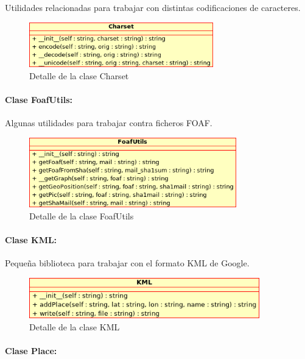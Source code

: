 Utilidades relacionadas para trabajar con distintas codificaciones de caracteres.

\begin{figure}[H]
	\centering
 	\includegraphics[width=8cm]{images/uml/clases/charset-class.png}
	\caption{Detalle de la clase Charset}
	\label{fig:uml:charset-class}
\end{figure}

\paragraph{Clase FoafUtils:}

Algunas utilidades para trabajar contra ficheros FOAF.

\begin{figure}[H]
	\centering
 	\includegraphics[width=9cm]{images/uml/clases/foafutils-class.png}
	\caption{Detalle de la clase FoafUtils}
	\label{fig:uml:foafutils-class}
\end{figure}

\paragraph{Clase KML:}

Pequeña biblioteca para trabajar con el formato KML de Google.

\begin{figure}[H]
	\centering
 	\includegraphics[width=10cm]{images/uml/clases/kml-class.png}
	\caption{Detalle de la clase KML}
	\label{fig:uml:kml-class}
\end{figure}

\paragraph{Clase Place:}

